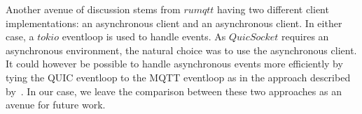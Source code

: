 Another avenue of discussion stems from $rumqtt$ having two different client implementations: an asynchronous client and an asynchronous client.
In either case, a $tokio$ eventloop is used to handle events.
As $QuicSocket$ requires an asynchronous environment, the natural choice was to use the asynchronous client.
It could however be possible to handle asynchronous events more efficiently by tying the QUIC eventloop to the MQTT eventloop as in the approach described by~\cite{kumar_implementation_2019}.
In our case, we leave the comparison between these two approaches as an avenue for future work.
